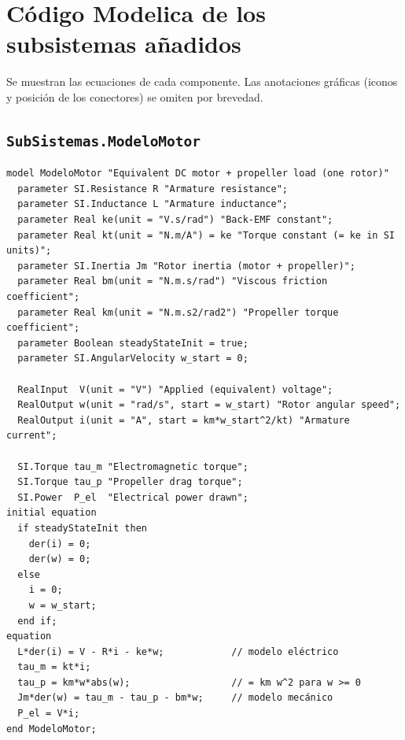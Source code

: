 \section{Código Modelica de los subsistemas añadidos}
\label{sec:codigo}

Se muestran las ecuaciones de cada componente. Las anotaciones gráficas (iconos y
posición de los conectores) se omiten por brevedad.

\subsection{\texttt{SubSistemas.ModeloMotor}}
\begin{lstlisting}
model ModeloMotor "Equivalent DC motor + propeller load (one rotor)"
  parameter SI.Resistance R "Armature resistance";
  parameter SI.Inductance L "Armature inductance";
  parameter Real ke(unit = "V.s/rad") "Back-EMF constant";
  parameter Real kt(unit = "N.m/A") = ke "Torque constant (= ke in SI units)";
  parameter SI.Inertia Jm "Rotor inertia (motor + propeller)";
  parameter Real bm(unit = "N.m.s/rad") "Viscous friction coefficient";
  parameter Real km(unit = "N.m.s2/rad2") "Propeller torque coefficient";
  parameter Boolean steadyStateInit = true;
  parameter SI.AngularVelocity w_start = 0;

  RealInput  V(unit = "V") "Applied (equivalent) voltage";
  RealOutput w(unit = "rad/s", start = w_start) "Rotor angular speed";
  RealOutput i(unit = "A", start = km*w_start^2/kt) "Armature current";

  SI.Torque tau_m "Electromagnetic torque";
  SI.Torque tau_p "Propeller drag torque";
  SI.Power  P_el  "Electrical power drawn";
initial equation
  if steadyStateInit then
    der(i) = 0;
    der(w) = 0;
  else
    i = 0;
    w = w_start;
  end if;
equation
  L*der(i) = V - R*i - ke*w;            // modelo eléctrico
  tau_m = kt*i;
  tau_p = km*w*abs(w);                  // = km w^2 para w >= 0
  Jm*der(w) = tau_m - tau_p - bm*w;     // modelo mecánico
  P_el = V*i;
end ModeloMotor;
\end{lstlisting}

